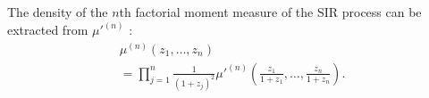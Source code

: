 \documentclass[lettersize,journal]{IEEEtran}
\begin{document}
    The density of the $n$th factorial moment measure of the SIR process can be extracted from $\mu'^{(n)}$ \cite[Corollary 6.1.3]{alma998193414406526}:
    \begin{align}
      \label{eq:densitySINR}
      &\mu^{(n)}(z_1,\dots,z_n)&  \nonumber\\
     &= \prod_{j=1}^n\frac{1}{(1+z_j)^2}\mu'^{(n)}\left(\frac{z_1}{1+z_1},\dots,\frac{z_n}{1+z_n}\right).
    \end{align}


\end{document}
